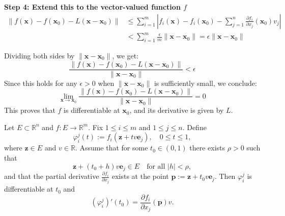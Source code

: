 \documentclass[12pt]{article}
\begin{document}
\begin{dbox}
\begin{pf}
\vspace{0.8em}
\noindent \textbf{Step 4: Extend this to the vector-valued function $f$}\\
\begin{align*}
\|f(\mathbf{x}) - f(\mathbf{x}_0) - L(\mathbf{x} - \mathbf{x}_0)\| &\le \sum_{i=1}^m \left| f_i(\mathbf{x}) - f_i(\mathbf{x}_0) - \sum_{j=1}^n \frac{\partial f_i}{\partial x_j}(\mathbf{x}_0) v_j \right| \\
&< \sum_{i=1}^m \frac{\epsilon}{m} \|\mathbf{x} - \mathbf{x}_0\| = \epsilon \|\mathbf{x} - \mathbf{x}_0\|
\end{align*}

Dividing both sides by $\|\mathbf{x} - \mathbf{x}_0\|$, we get:
$$\frac{\|f(\mathbf{x}) - f(\mathbf{x}_0) - L(\mathbf{x} - \mathbf{x}_0)\|}{\|\mathbf{x} - \mathbf{x}_0\|} < \epsilon$$
Since this holds for any $\epsilon > 0$ when $\|\mathbf{x} - \mathbf{x}_0\|$ is sufficiently small, we conclude:
$$\lim_{\mathbf{x} \to \mathbf{x}_0} \frac{\|f(\mathbf{x}) - f(\mathbf{x}_0) - L(\mathbf{x} - \mathbf{x}_0)\|}{\|\mathbf{x} - \mathbf{x}_0\|} = 0$$
This proves that $f$ is differentiable at $\mathbf{x}_0$, and its derivative is given by $L$.
\end{pf}
\end{dbox}

\begin{lemma}
Let $E \subset \mathbb{R}^n$ and $f: E \to \mathbb{R}^m$. Fix $1 \le i \le m$ and $1 \le j \le n$. Define
$$ \varphi_i^j(t) := f_i(\mathbf{z} + t v \mathbf{e}_j), \quad 0 \le t \le 1, $$
where $\mathbf{z} \in E$ and $v \in \mathbb{R}$. Assume that for some $t_0 \in (0, 1)$ there exists $\rho > 0$ such that
$$ \mathbf{z} + (t_0 + h)v \mathbf{e}_j \in E \quad \text{for all } |h| < \rho, $$
and that the partial derivative $\frac{\partial f_i}{\partial x_j}$ exists at the point $\mathbf{p} := \mathbf{z} + t_0 v \mathbf{e}_j$. Then $\varphi_i^j$ is differentiable at $t_0$ and
$$ (\varphi_i^j)'(t_0) = \frac{\partial f_i}{\partial x_j}(\mathbf{p}) v. $$
\label{coordinate chain rule}
\end{lemma}
\end{document}
